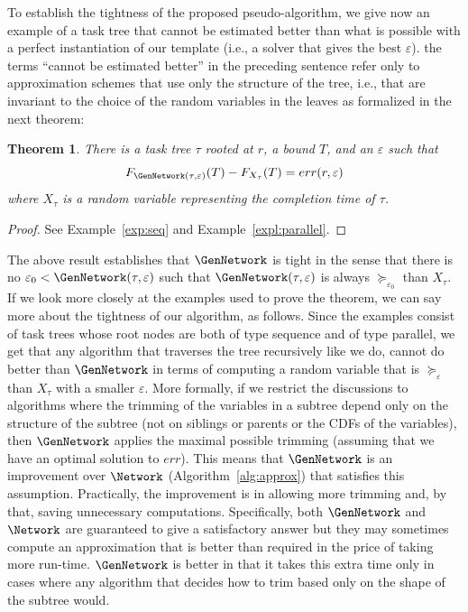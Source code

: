 \documentclass[review]{elsarticle}
\newtheorem{theorem}{Theorem}
\begin{document}
To establish the tightness of the proposed pseudo-algorithm, we give now an example of a task tree that cannot be estimated better than what is possible with a perfect instantiation of our template (i.e., a solver that gives the best $\varepsilon$). the terms ``cannot be estimated better'' in the preceding sentence refer only to approximation schemes that use only the structure of the tree, i.e., that are invariant to the choice of the random variables in the leaves as formalized in the next theorem:

\begin{theorem}\label{theorem:tight}
There is a task tree $\tau$ rooted at $r$, a bound $T$, and an $\varepsilon$ 
such that $$F_{\GenNetwork(\tau, \varepsilon)}(T) - F_{X_\tau}(T) = err(r, \varepsilon)$$ where $X_\tau$ is a random variable representing the completion time of $\tau$. 
\end{theorem}
\begin{proof}
See Example~\ref{exp:seq} and Example~\ref{expl:parallel}.
\end{proof}



The above result establishes that $\GenNetwork$ is tight in the sense that there is no $\varepsilon_0 < \GenNetwork(\tau, \varepsilon)$ 
such that $\GenNetwork(\tau, \varepsilon)$ is always $\succeq_{\varepsilon_0}$ than $X_{\tau}$. 
If we look more closely at the examples used
to prove the theorem, we can say more about the tightness of our algorithm, as follows.
Since the examples consist of task trees whose root nodes are both of
type sequence and of type parallel, we get that any algorithm that traverses the tree
recursively like we do, cannot do better than $\GenNetwork$ in terms of computing a
random variable that is $\succeq_{\varepsilon}$ than $X_{\tau}$ with a smaller $\varepsilon$. 
More formally, if we restrict the discussions to algorithms where the trimming of the variables in a subtree
depend only on the structure of the subtree (not on siblings or parents or the CDFs of the variables), then 
$\GenNetwork$ applies the maximal possible trimming (assuming that we have an optimal solution to $err$). 
This means that $\GenNetwork$ is an improvement over 
$\Network$ (Algorithm~\ref{alg:approx}) that satisfies this assumption. 
Practically, the improvement is in allowing more trimming and, by that, saving unnecessary computations. 
Specifically, both $\GenNetwork$ and $\Network$ are guaranteed to give a satisfactory answer but they may sometimes compute 
an approximation that is better than required in the price of taking more run-time. $\GenNetwork$ is better in that it
takes this extra time only in cases where any algorithm that decides how to trim based only on the shape of the subtree would.
\end{document}
